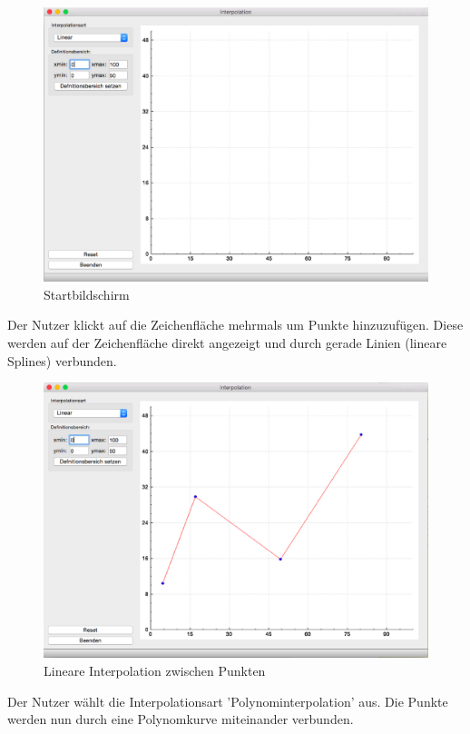\begin{figure}[H]
\centering
\includegraphics[width=\textwidth]{figures/start_screen.eps}
\caption{Startbildschirm}
\end{figure}

\noindent Der Nutzer klickt auf die Zeichenfl\"ache mehrmals um Punkte hinzuzuf\"ugen. Diese werden auf der Zeichenfl\"ache direkt angezeigt und durch gerade Linien (lineare Splines) verbunden.\\

\begin{figure}[H]
\centering
\includegraphics[width=\textwidth]{figures/linear_interpol_screen.eps}
\caption{Lineare Interpolation zwischen Punkten}
\end{figure}

\noindent Der Nutzer w\"ahlt die Interpolationsart 'Polynominterpolation' aus. Die Punkte werden nun durch eine Polynomkurve miteinander verbunden.\\

